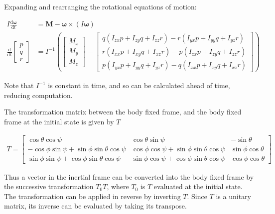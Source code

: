 \documentclass[11pt, twoside]{article}
\numberwithin{equation}{section}
\renewcommand{\vec}{\mathbf}
\begin{document}
Expanding and rearranging the rotational equations of motion:

\begin{align}
	I \frac{\mathrm{d}\vec{\omega}}{\mathrm{d}t} &= \vec{M} - \vec{\omega} \times (I\vec{\omega})\\
	\frac{\mathrm{d}}{\mathrm{d}t}
	\begin{bmatrix}
		p \\ q \\ r
	\end{bmatrix} &= 
	I^{-1} \left( \begin{bmatrix}
		M_x \\ M_y \\ M_z
	\end{bmatrix}	 
	- \left[\begin{array}{c} q \left(I_{zx} p+I_{zy} q + I_{zz} r\right)-r \left(I_{yx} p + I_{yy} q + I_{yz} r \right)\\
	 r \left(I_{xx} p + I_{xy} q + I_{xz} r \right) - p\left(I_{zx} p + I_{zy} q + I_{zz} r \right)\\
	  p \left(I_{yx} p + I_{yy} q + I_{yz} r \right) - q\left(I_{xx} p + I_{xy}  q + I_{xz} r \right) \end{array}\right]
 \right)
\end{align}

Note that \(I^{-1}\) is constant in time, and so can be calculated ahead of time, reducing computation.

The transformation matrix between the body fixed frame, and the body fixed frame at the initial state is given by \(T\)

\begin{align}
	T = 
	\begin{bmatrix}
		\cos\theta \cos\psi & \cos\theta \sin\psi & -\sin\theta \\
		-\cos\phi \sin\psi + \sin\phi \sin\theta \cos\psi & \cos\phi \cos\psi + \sin\phi \sin\theta \cos\psi & \sin\phi \cos\theta \\
		\sin\phi \sin\psi + \cos\phi \sin\theta \cos\psi & \sin\phi \cos\psi + \cos\phi \sin\theta \cos\psi & \cos\phi \cos\theta
	\end{bmatrix}
\end{align}

Thus a vector in the inertial frame can be converted into the body fixed frame by the successive transformation \(T_0 T\), where \(T_0\) is \(T\) evaluated at the initial state. The transformation can be applied in reverse by inverting \(T\). Since \(T\) is a unitary matrix, its inverse can be evaluated by taking its transpose.
\end{document}
